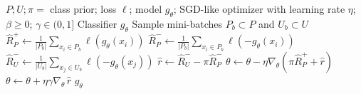 \documentclass{article}
\begin{document}
\begin{algorithm}[!h]
\renewcommand{\algorithmicrequire}{\textbf{Input:}} %
\renewcommand{\algorithmicensure}{\textbf{Output:}} %
	\caption{nnPU (non-negative PU learning)} %
	\begin{algorithmic}[1] %
	    \REQUIRE
	    $P;U;\pi=$ class prior; loss $\ell$; model $g_{\theta}$; SGD-like optimizer with learning rate $\eta$; $\beta\geq 0$; $\gamma\in(0,1]$
	    \ENSURE
	    Classifier $g_{\theta}$
	    \STATE Sample mini-batches $P_b\subset P$ and $U_b\subset U$
	    \STATE $\hat{R}_{P}^{+}\leftarrow \frac{1}{|P_b|}\sum_{x_i\in P_b}\ell(g_{\theta}(x_i))$
	    \STATE $\hat{R}_{P}^{-}\leftarrow \frac{1}{|P_b|}\sum_{x_i\in P_b}\ell(-g_{\theta}(x_i))$
	    \STATE $\hat{R}_{U}^{-}\leftarrow \frac{1}{|U_b|}\sum_{x_j\in U_b}\ell(-g_{\theta}(x_j))$
	    \STATE $\hat{r}\leftarrow \hat{R}_{U}^{-}-\pi \hat{R}_{P}^{-}$ %
	    \STATE $\theta\leftarrow \theta-\eta \nabla_{\theta}\left(\pi \hat{R}_{P}^{+}+\hat{r}\right)$ %
	    \ELSE
	    \STATE $\theta\leftarrow \theta+\eta\gamma \nabla_{\theta}\,\hat{r}$ %
	    \ENDIF
	    \ENDWHILE
		\RETURN $g_{\theta}$
	\end{algorithmic}
\end{algorithm}
\end{document}

